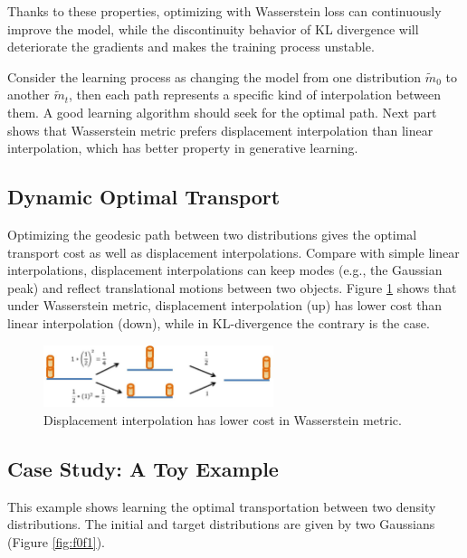 \documentclass{article}
\begin{document}
Thanks to these properties, optimizing with Wasserstein loss can continuously improve the model, while the discontinuity behavior of KL divergence will deteriorate the gradients and makes the training process unstable.

Consider the learning process as changing the model from one distribution $\tilde{m}_0$ to another $\tilde{m}_t$, then each path represents a specific kind of interpolation between them. A good learning algorithm should seek for the optimal path. Next part shows that Wasserstein metric prefers displacement interpolation than linear interpolation, which has better property in generative learning.




\subsection{Dynamic Optimal Transport}

Optimizing the geodesic path between two distributions gives the optimal transport cost as well as displacement interpolations. Compare with simple linear interpolations, displacement interpolations can keep modes (e.g., the Gaussian peak) and reflect translational motions between two objects. Figure \ref{fig:w7} shows that under Wasserstein metric, displacement interpolation (up) has lower cost than linear interpolation (down), while in KL-divergence the contrary is the case.

\begin{figure}[htb!]
\centering
\includegraphics[width=0.6\textwidth]{FIGDRG/w7}
\caption{Displacement interpolation has lower cost in Wasserstein metric.}
\label{fig:w7}
\end{figure}


\subsection{Case Study: A Toy Example}
This example shows learning the optimal transportation between two density distributions. The initial and target distributions are given by two Gaussians (Figure \ref{fig:f0f1}).
\end{document}
